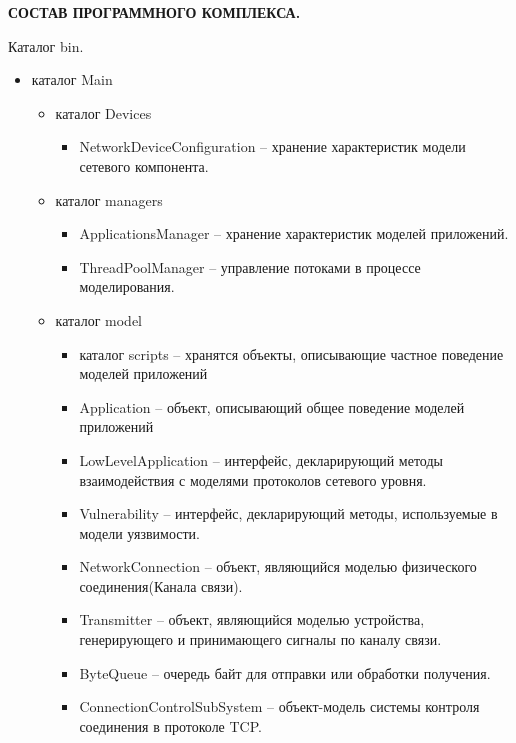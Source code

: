 \newpage

    \begin{center}
        \large\textbf{ СОСТАВ ПРОГРАММНОГО КОМПЛЕКСА.}
    \end{center}

    Каталог bin.
    \begin{itemize}
        \item каталог Main
        \begin{itemize}
            \item каталог Devices
            \begin{itemize}
                \item NetworkDeviceConfiguration -- хранение характеристик модели сетевого компонента.
            \end{itemize}
            \item каталог managers
            \begin{itemize}
                \item ApplicationsManager -- хранение характеристик моделей приложений.
                \item ThreadPoolManager -- управление потоками в процессе моделирования.
            \end{itemize}
            \item каталог model
            \begin{itemize}
                        \item каталог scripts -- хранятся объекты, описывающие частное поведение моделей приложений
                        \item Application -- объект, описывающий общее поведение моделей приложений
                        \item LowLevelApplication -- интерфейс, декларирующий методы взаимодействия с моделями протоколов сетевого уровня.
                        \item Vulnerability -- интерфейс, декларирующий методы, используемые в модели уязвимости.
                        \item NetworkConnection -- объект, являющийся моделью физического соединения(Канала связи).
                        \item Transmitter -- объект, являющийся моделью устройства, генерирующего и принимающего сигналы по каналу связи.
                               \item ByteQueue -- очередь байт для отправки или обработки получения.
                               \item ConnectionControlSubSystem -- объект-модель системы контроля соединения в протоколе TCP.

\end{itemize}
\end{itemize}
\end{itemize}
